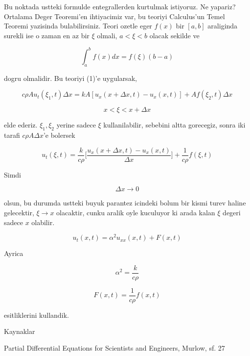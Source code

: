 \documentclass[12pt,fleqn]{article}\usepackage{../common}
\begin{document}
Bu noktada ustteki formulde entegrallerden kurtulmak istiyoruz. Ne yapariz?
Ortalama Deger Teoremi'en ihtiyacimiz var, bu teoriyi Calculus'un Temel
Teoremi yazisinda bulabilirsiniz. Teori ozetle eger $f(x)$ bir $[a,b]$
araliginda surekli ise o zaman en az bir $\xi$ olmali, $a < \xi < b$ olacak
sekilde ve

\[ \int _{ a}^{b} f(x) dx = f(\xi)(b-a)  \]

dogru olmalidir. Bu teoriyi (1)'e uygularsak,

\[ c\rho A u_t(\xi_1,t)\Delta x = 
kA[u_x(x+\Delta x, t) - u_x(x,t)] + 
Af(\xi_2,t)\Delta x
 \]

\[ x < \xi < x+\Delta x \]

elde ederiz. $\xi_1,\xi_2$ yerine sadece $\xi$ kullanilabilir, sebebini
altta gorecegiz, sonra iki tarafi $c\rho A \Delta x$'e bolersek


\[ u_t(\xi,t) = 
\frac{k}{c\rho} \bigg[
\frac{u_x(x+\Delta x,t) - u_x(x,t)}
{\Delta x}
\bigg]
+ \frac{ 1}{c\rho}f(\xi,t)
 \]

Simdi 

\[ \Delta x \to 0 \]

olsun, bu durumda ustteki buyuk parantez icindeki bolum bir kismi turev
haline gelecektir, $\xi \to x$ olacaktir, cunku aralik oyle kuculuyor ki
arada kalan $\xi$ degeri sadece $x$ olabilir.

\[ u_t(x,t) = \alpha^2u_{xx}(x,t) + F(x,t) \]

Ayrica

\[ \alpha^2 = \frac{k}{c\rho} \]

\[ F(x,t) = \frac{1}{c\rho}f(x,t) \]

esitliklerini kullandik. 

Kaynaklar

Partial Differential Equations for Scientists and Engineers, Murlow, sf. 27
\end{document}
